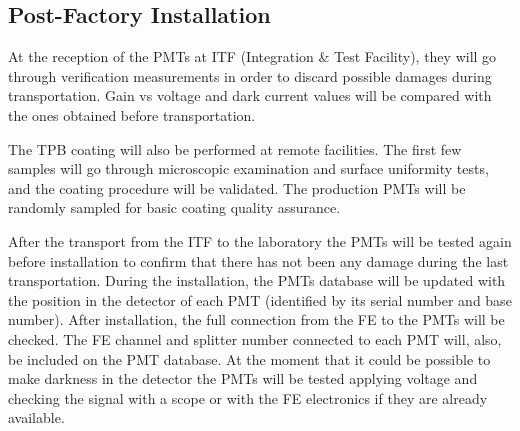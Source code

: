  \subsection{Post-Factory Installation}
 \label{sec:fddp-pd-10.2}
 
At the reception of the PMTs at ITF (Integration \& Test Facility), they will go through verification measurements in order to discard possible damages during transportation. Gain vs voltage and dark current values will be compared with the ones obtained before transportation.

The TPB coating will also be performed at remote facilities. The first few samples will go through microscopic examination and surface uniformity tests, and the coating procedure will be validated. The production PMTs will be randomly sampled for basic coating quality assurance.

After the transport from the ITF to the laboratory the PMTs will be tested again before installation to confirm that there has not been any damage during the last transportation. During the installation, the PMTs database will be updated with the position in the detector of each PMT (identified by its serial number and base number). After installation, the full connection from the FE to the PMTs will be checked. The FE channel and splitter number connected to each PMT will, also, be included on the PMT database. At the moment that it could be possible to make darkness in the detector the PMTs will be tested applying voltage and checking the signal with a scope or with the FE electronics if they are already available.



